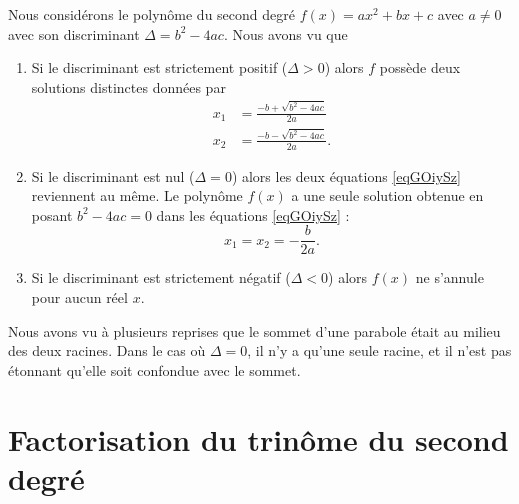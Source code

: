 \begin{Aretenir}
Nous considérons le polynôme du second degré \( f(x)=ax^2+bx+c\) avec \( a\neq 0\) avec son discriminant \( \Delta=b^2-4ac\). Nous avons vu que
\begin{enumerate}
    \item
        Si le discriminant est strictement positif (\( \Delta>0\)) alors \( f\) possède deux solutions distinctes données par
        \begin{subequations}    \label{eqGOiySz}
            \begin{align}
            x_1&=\frac{ -b+\sqrt{b^2-4ac} }{ 2a }\\
            x_2&=\frac{ -b-\sqrt{b^2-4ac} }{ 2a }.
            \end{align}
        \end{subequations}
    \item
        Si le discriminant est nul (\( \Delta=0\)) alors les deux équations \eqref{eqGOiySz} reviennent au même. Le polynôme \( f(x)\) a une seule solution obtenue en posant \( b^2-4ac=0\) dans les équations \ref{eqGOiySz} : 
        \begin{equation}
            x_1=x_2=-\frac{ b }{ 2a }.
        \end{equation}
    \item
        Si le discriminant est strictement négatif (\( \Delta<0\)) alors \( f(x)\) ne s'annule pour aucun réel \( x\).
\end{enumerate}
\end{Aretenir}
\begin{remark}
    Nous avons vu à plusieurs reprises que le sommet d'une parabole était au milieu des deux racines. Dans le cas où \( \Delta=0\), il n'y a qu'une seule racine, et il n'est pas étonnant qu'elle soit confondue avec le sommet.
\end{remark}

\section{Factorisation du trinôme du second degré}

